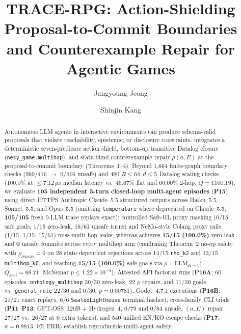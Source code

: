 \documentclass[sigconf,anonymous,review]{acmart}
\begin{document}
\title{TRACE-RPG: Action-Shielding Proposal-to-Commit Boundaries and Counterexample Repair for Agentic Games}

\author{Jangyoung Jeong}
\author{Shinjin Kang}

\begin{abstract}
Autonomous LLM agents in interactive environments can produce schema-valid proposals that violate reachability, epistemic, or disclosure constraints. \system{} integrates a deterministic seven-predicate action shield, bottom-up transitive Datalog closure (\texttt{nesy\_game.multihop}), and state-blind counterexample repair $\rho(a,E)$ at the proposal-to-commit boundary (Theorems~1--4). Beyond 1,664 finite-graph boundary checks (260/416 $\rightarrow$ 0/416 unsafe) and 480 $R{\le}64, d{\le}5$ Datalog scaling checks (100.0\% at $\le$7.12\,$\mu$s median latency vs.\ 46.67\% flat and 60.00\% 2-hop, $Q{=}1100.19$), we evaluate \textbf{105 independent 5-turn closed-loop multi-agent episodes} (\textbf{P15}) using direct HTTPS Anthropic Claude~5.5 structured outputs across Haiku~5.5, Sonnet~5.5, and Opus~5.5 (omitting \texttt{temperature} where deprecated on Claude~5.5; \textbf{105/105} fresh 0-LLM trace replays exact): controlled Safe-RL proxy masking (0/15 safe goals, 1/15 zero-leak, 16/61 unsafe turns) and NeMo-style Colang proxy rails (1/15, 1/15, 15/61) miss multi-hop leaks, whereas \system{} achieves \textbf{15/15 (100.0\%)} zero-leak and \textbf{0} unsafe commits across every multihop arm (confirming Theorem~2 no-op safety with $\rho_{\mathrm{repairs}}{=}0$ on 28 state-dependent rejections across 14/15 \texttt{rho\_k2} and 13/15 \texttt{multihop\_k0}, and reaching \textbf{15/15 (100.0\%)} safe goals via $\rho{+}\text{LLM}_{K=1}$; $Q_{\mathrm{goal}}{=}68.71$, McNemar $p{\le}1.22{\times}10^{-4}$). Attested API factorial runs (\textbf{P16A}: 60 episodes, \texttt{ontology\_multihop} 30/30 zero-leak, 22 $\rho$ repairs, and 11/30 goals vs.\ \texttt{general\_rule} 22/30 and 0/30, $p{=}0.00781$), Godot~4.7.1 executions (\textbf{P16B}: 21/21 exact replays, 6/6 \texttt{SealedLighthouse} terminal hashes), cross-family CLI trials (\textbf{P11}--\textbf{P13}: GPT-OSS~120B + Hydrogen~4, 0/79 and 0/84 unsafe, $(a,E)$ repair 27/27 vs.\ 26/27 at 0 extra tokens), and 540 unified EN/KO escape checks (\textbf{P17}: $\kappa{=}0.8813$, 0\% FRR) establish reproducible multi-agent safety.
\end{abstract}
\end{document}
